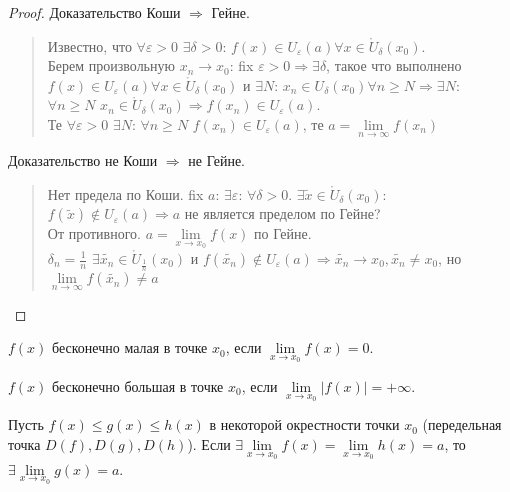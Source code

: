 \documentclass[12pt]{article}
\begin{document}
	\begin{proof}
		Доказательство Коши $\Rightarrow$ Гейне.
		\begin{quote}
			Известно, что $\forall \varepsilon > 0$ $\exists \delta > 0$: $f(x) \in U_{\varepsilon}(a) \forall x \in \mathring{U}_{\delta}(x_0)$. \\
			Берем произвольную $x_n \rightarrow x_0$: fix $\varepsilon > 0 \Rightarrow \exists \delta$, такое что выполнено $f(x) \in U_{\varepsilon}(a) \forall x \in \mathring{U}_{\delta}(x_0)$ и $\exists N$: $x_n \in U_{\delta}(x_0) \forall n \geqslant N \Rightarrow \exists N$: $\forall n \geqslant N$ $x_n \in \mathring{U}_{\delta}(x_0) \Rightarrow f(x_n) \in U_{\varepsilon}(a)$. \\
			Те $\forall \varepsilon > 0$ $\exists N$: $\forall n \geqslant N$ $f(x_n) \in U_{\varepsilon}(a)$, те $a = \lim \limits_{n \rightarrow \infty}f(x_n)$
		\end{quote}
		Доказательство не Коши $\Rightarrow$ не Гейне.
		\begin{quote}
			Нет предела по Коши. fix $a$: $\exists \varepsilon$: $\forall \delta > 0$. $\exists \tilde{x} \in \mathring{U}_{\delta}(x_0)$: $f(\tilde{x}) \not\in U_{\varepsilon}(a) \Rightarrow a$ не является пределом по Гейне? \\
			От противного. $a = \lim \limits_{x \rightarrow x_0} f(x)$ по Гейне. \\
			$\delta_n = \frac{1}{n}$ $\exists \tilde{x_n} \in \mathring{U}_{\frac{1}{n}}(x_0)$ и $f(\tilde{x_n}) \not\in U_{\varepsilon}(a) \Rightarrow \tilde{x_n} \rightarrow x_0, \tilde{x_n} \not= x_0$, но $\lim \limits_{n \rightarrow \infty} f(\tilde{x_n}) \not= a$
		\end{quote}
	\end{proof}
	\noindent
	\begin{statement}
		$f(x)$ бесконечно малая в точке $x_0$, если $\lim \limits_{x \rightarrow x_0} f(x) = 0$.
	\end{statement}
	\begin{statement}
		$f(x)$ бесконечно большая в точке $x_0$, если $\lim \limits_{x \rightarrow x_0} |f(x)| = +\infty$.
	\end{statement}
	\begin{lemma}
		Пусть $f(x) \leqslant g(x) \leqslant h(x)$ в некоторой окрестности точки $x_0$ (передельная точка $D(f), D(g), D(h)$). Если $\exists \lim \limits_{x \rightarrow x_0} f(x) = \lim \limits_{x \rightarrow x_0} h(x) = a$, то $\exists \lim \limits_{x \rightarrow x_0} g(x) = a$.
	\end{lemma}
\end{document}
